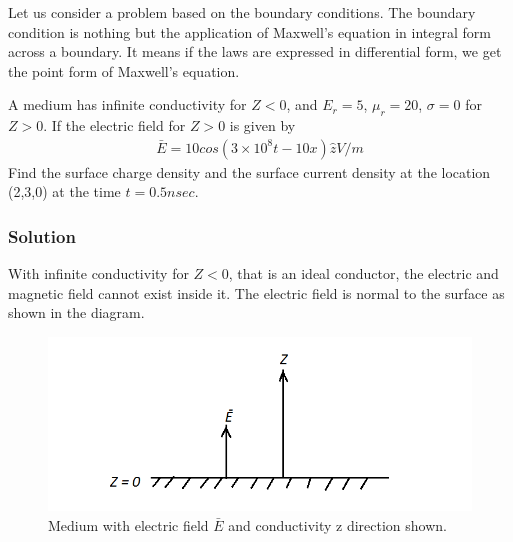 Let us consider a problem based on the boundary conditions. The boundary condition is nothing but the application of Maxwell's equation in integral form across a boundary. It means if the laws are expressed in differential form, we get the point form of Maxwell's equation.
\begin{exmp}
A medium has infinite conductivity for $Z<0$, and $E_r=5$, $\mu_r = 20$, $\sigma = 0$ for $Z>0$. If the electric field for $Z>0$ is given by 
\begin{align*}
\bar{E} = 10cos(3\times 10^8t - 10x)\hat{z}  V/m
\end{align*}
Find the surface charge density and the surface current density at the location (2,3,0) at the time $t = 0.5nsec$.\\
\subsubsection*{Solution}
With infinite conductivity for $Z<0$, that is an ideal conductor, the electric and magnetic field cannot exist inside it. The electric field is normal to the surface as shown in the diagram.
\begin{figure}[h]
\centering
\includegraphics[width=1\linewidth]{graphics/diemedium7}
\caption{Medium with electric field $\bar{E}$ and conductivity z direction shown.}
\end{figure}


\end{exmp}
